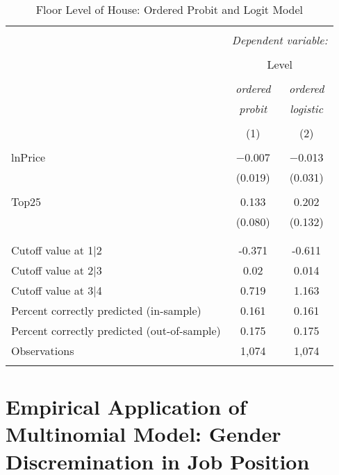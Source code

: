 \documentclass[
  12pt,
]{article}
\begin{document}
\begin{table}[t] \centering 
  \caption{Floor Level of House: Ordered Probit and Logit Model} 
  \label{housing} 
\begin{tabular}{@{\extracolsep{5pt}}lcc} 
\\[-1.8ex]\hline 
\hline \\[-1.8ex] 
 & \multicolumn{2}{c}{\textit{Dependent variable:}} \\ 
\cline{2-3} 
\\[-1.8ex] & \multicolumn{2}{c}{Level} \\ 
\\[-1.8ex] & \textit{ordered} & \textit{ordered} \\ 
 & \textit{probit} & \textit{logistic} \\ 
\\[-1.8ex] & (1) & (2)\\ 
\hline \\[-1.8ex] 
 lnPrice & $-$0.007 & $-$0.013 \\ 
  & (0.019) & (0.031) \\ 
  & & \\ 
 Top25 & 0.133 & 0.202 \\ 
  & (0.080) & (0.132) \\ 
  & & \\ 
\hline \\[-1.8ex] 
Cutoff value at 1|2 & -0.371 & -0.611 \\ 
Cutoff value at 2|3 & 0.02 & 0.014 \\ 
Cutoff value at 3|4 & 0.719 & 1.163 \\ 
Percent correctly predicted (in-sample) & 0.161 & 0.161 \\ 
Percent correctly predicted (out-of-sample) & 0.175 & 0.175 \\ 
Observations & 1,074 & 1,074 \\ 
\hline 
\hline \\[-1.8ex] 
\end{tabular} 
\end{table}

\hypertarget{empirical-application-of-multinomial-model-gender-discremination-in-job-position}{%
\section{Empirical Application of Multinomial Model: Gender
Discremination in Job
Position}\label{empirical-application-of-multinomial-model-gender-discremination-in-job-position}}
\end{document}
